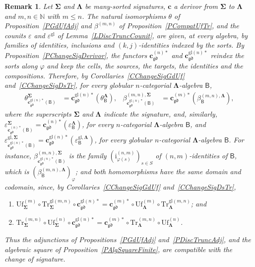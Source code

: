 \documentclass[a4paper, reqno
]{amsart}
\newcommand{\sig}[1]{\mathbf{#1}}             %
\newcommand{\calg}[1]{\boldsymbol{\mathsf{#1}}} %
\newcommand{\gd}{\mathfrak{gd}}              %
\newcommand{\gl}{\mathrm{gl}}                %
\newcommand{\Uf}{\mathrm{Uf}}
\newcommand{\Tr}{\mathrm{Tr}}
\theoremstyle{plain}
\newtheorem{remark}[theorem]{Remark}
\theoremstyle{definition}
\begin{document}
\begin{remark}\label{RChangeSigNat}
Let $\sig{\Sigma}$ and $\sig{\Lambda}$ be many-sorted signatures, $\mathbf{c}$ a derivor from $\sig{\Sigma}$ to $\sig{\Lambda}$ and $m,n\in\mathbb{N}$ with $m\leq n$.
The natural isomorphisms $\theta$ of Proposition~\ref{PGdUfAdj} and $\beta^{(m,n)}$ of Proposition~\ref{PCompatUfTr}, and the counits $\varepsilon$ and $\varepsilon^{\gl}$ of Lemma~\ref{LDiscTruncCounit}, are given, at every algebra, by families of identities, inclusions and $(k,j)$-identities indexed by the sorts.
By Proposition~\ref{PChangeSigDerivor}, the functors $\mathbf{c}^{(n)\ast}_{\gd}$ and $\mathbf{c}^{\gl(n)\ast}_{\gd}$ reindex the sorts along $\varphi$ and keep the cells, the sources, the targets, the identities and the compositions.
Therefore, by Corollaries~\ref{CChangeSigGdUf} and~\ref{CChangeSigDsTr}, for every globular $n$-categorial $\sig{\Lambda}$-algebra $\calg{B}$,
\begin{align*}
\theta^{\sig{\Sigma}}_{\mathbf{c}^{\gl(n)\ast}_{\gd}(\calg{B})}&=\mathbf{c}^{\gl(n)\ast}_{\gd}\left(\theta^{\sig{\Lambda}}_{\calg{B}}\right),
&
\beta^{(m,n),\sig{\Sigma}}_{\mathbf{c}^{\gl(n)\ast}_{\gd}(\calg{B})}&=\mathbf{c}^{(m)\ast}_{\gd}\left(\beta^{(m,n),\sig{\Lambda}}_{\calg{B}}\right),
\end{align*}
where the superscripts $\sig{\Sigma}$ and $\sig{\Lambda}$ indicate the signature, and, similarly, $\varepsilon^{\sig{\Sigma}}_{\mathbf{c}^{(n)\ast}_{\gd}(\calg{B})}=\mathbf{c}^{(n)\ast}_{\gd}(\varepsilon^{\sig{\Lambda}}_{\calg{B}})$, for every $n$-categorial $\sig{\Lambda}$-algebra $\calg{B}$, and $\varepsilon^{\gl,\sig{\Sigma}}_{\mathbf{c}^{\gl(n)\ast}_{\gd}(\calg{B})}=\mathbf{c}^{\gl(n)\ast}_{\gd}(\varepsilon^{\gl,\sig{\Lambda}}_{\calg{B}})$, for every globular $n$-categorial $\sig{\Lambda}$-algebra $\calg{B}$.
For instance, $\beta^{(m,n),\sig{\Sigma}}_{\mathbf{c}^{\gl(n)\ast}_{\gd}(\calg{B})}$ is the family $(\mathrm{i}^{(n,m)}_{\varphi(s)})_{s\in S}$ of $(n,m)$-identities of $\calg{B}$, which is $(\beta^{(m,n),\sig{\Lambda}}_{\calg{B}})_{\varphi}$; and both homomorphisms have the same domain and codomain, since, by Corollaries~\ref{CChangeSigGdUf} and~\ref{CChangeSigDsTr},
\begin{enumerate}
	\item
	$ \Uf^{(m)}_{\sig{\Sigma}}\circ\Tr^{\gl(m,n)}_{\sig{\Sigma}}\circ\mathbf{c}^{\gl(n)\ast}_{\gd}=\mathbf{c}^{(m)\ast}_{\gd}\circ\Uf^{(m)}_{\sig{\Lambda}}\circ\Tr^{\gl(m,n)}_{\sig{\Lambda}} $; and

	\item
	$ \Tr^{(m,n)}_{\sig{\Sigma}}\circ\Uf^{(n)}_{\sig{\Sigma}}\circ\mathbf{c}^{\gl(n)\ast}_{\gd}=\mathbf{c}^{(m)\ast}_{\gd}\circ\Tr^{(m,n)}_{\sig{\Lambda}}\circ\Uf^{(n)}_{\sig{\Lambda}} $.
\end{enumerate}
Thus the adjunctions of Propositions~\ref{PGdUfAdj} and~\ref{PDiscTruncAdj}, and the algebraic square of Proposition~\ref{PAlgSquareFinite}, are compatible with the change of signature.
\end{remark}
\end{document}
